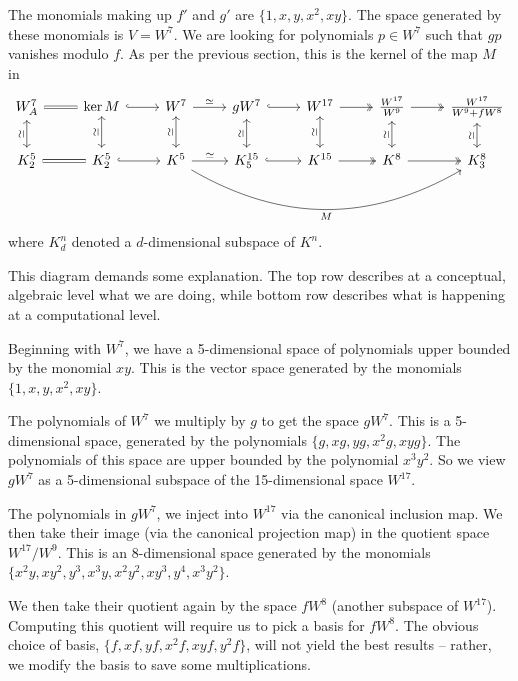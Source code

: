 The monomials making up $f'$ and $g'$ are $\{1, x, y, x^2, xy\}$.
The space generated by these monomials is $V = W^7$.
We are looking for polynomials $p \in W^7$ such that $gp$ vanishes modulo $f$.
As per the previous section, this is the kernel of the map $M$ in
\[ \begin{tikzcd}
  W_A^7 \arrow[equal]{r} \arrow[leftrightarrow,swap,"\rotatebox{90}{$\simeq$}"]{d}
    & \ker M \arrow[hook]{r} \arrow[leftrightarrow,swap,"\rotatebox{90}{$\simeq$}"]{d}
    & W^7 \arrow["\simeq"]{r} \arrow[leftrightarrow,swap,"\rotatebox{90}{$\simeq$}"]{d}
    & gW^7 \arrow[hook]{r} \arrow[leftrightarrow,swap,"\rotatebox{90}{$\simeq$}"]{d}
    & W^{17} \arrow[two heads]{r} \arrow[leftrightarrow,swap,"\rotatebox{90}{$\simeq$}"]{d}
    & \frac{W^{17}}{W^9} \arrow[two heads]{r} \arrow[leftrightarrow,swap,"\rotatebox{90}{$\simeq$}"]{d}
    & \frac{W^{17}}{W^9 + fW^8}  \arrow[leftrightarrow,swap,"\rotatebox{90}{$\simeq$}"]{d} \\
   K_2^5 \arrow[equal]{r}
    & K_2^5 \arrow[hook]{r}
    & K^5 \arrow["\simeq"]{r} \arrow[bend right,swap,"M"]{rrrr}
    & K_5^{15} \arrow[hook]{r}
    & K^{15} \arrow[two heads]{r}
    & K^8 \arrow[two heads]{r}
    & K_3^8 
\end{tikzcd} \]
where $K_d^n$ denoted a $d$-dimensional subspace of $K^n$.

This diagram demands some explanation.
The top row describes at a conceptual, algebraic level what we are doing,
while bottom row describes what is happening at a computational level.

Beginning with $W^7$, we have a 5-dimensional space of polynomials upper bounded by the monomial $xy$.
This is the vector space generated by the monomials $\{1, x, y, x^2, xy\}$.

The polynomials of $W^7$ we multiply by $g$ to get the space $gW^7$.
This is a 5-dimensional space, generated by the polynomials $\{g, xg, yg, x^2g, xyg\}$.
The polynomials of this space are upper bounded by the polynomial $x^3y^2$.
So we view $gW^7$ as a 5-dimensional subspace of the 15-dimensional space $W^{17}$.

The polynomials in $gW^7$, we inject into $W^{17}$ via the canonical inclusion map.
We then take their image (via the canonical projection map) in the quotient space $W^{17}/W^9$.
This is an 8-dimensional space generated by the monomials $\{x^2y, xy^2, y^3, x^3y, x^2y^2, xy^3, y^4, x^3y^2\}$.

We then take their quotient again by the space $fW^8$ (another subspace of $W^{17}$).
Computing this quotient will require us to pick a basis for $fW^8$.
The obvious choice of basis, $\{f, xf, yf, x^2f, xyf, y^2f\}$, will not yield the best results --
rather, we modify the basis to save some multiplications.

